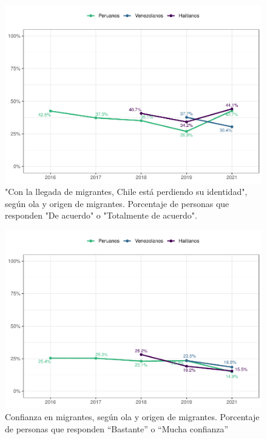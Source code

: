 \documentclass[
  12pt,
  openany]{book}
\begin{document}
\begin{figure}

{\centering \includegraphics{reporte-elsoc_files/figure-latex/amen2-wave-1} 

}

\caption{"Con la llegada de migrantes, Chile está perdiendo su identidad", según ola y origen de migrantes. Porcentaje de personas que responden "De acuerdo" o "Totalmente de acuerdo".}\label{fig:amen2-wave}
\end{figure}

\begin{figure}

{\centering \includegraphics{reporte-elsoc_files/figure-latex/conf-wave-1} 

}

\caption{Confianza en migrantes, según ola y origen de migrantes. Porcentaje de personas que responden “Bastante” o “Mucha confianza”}\label{fig:conf-wave}
\end{figure}
\end{document}
